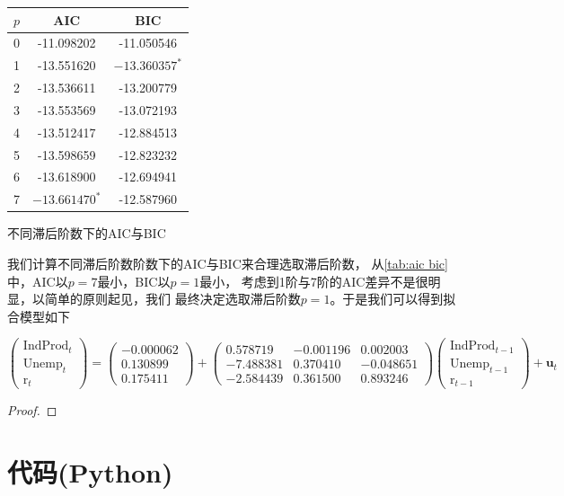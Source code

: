 \documentclass[cn]{homework}
\begin{document}
    \begin{margintable}
        \centering
        \begin{tabular}{ccc}
            \toprule
            $p$ & AIC  & BIC \\
            \midrule
            0 & -11.098202& -11.050546\\
            1 & -13.551620& $-13.360357^*$ \\
            2 & -13.536611& -13.200779\\
            3 & -13.553569& -13.072193\\
            4 & -13.512417& -12.884513\\
            5 & -13.598659& -12.823232\\
            6 & -13.618900& -12.694941\\
            7 & $-13.661470^*$ & -12.587960\\
            \bottomrule
        \end{tabular}
        \caption{不同滞后阶数下的AIC与BIC}
        \label{tab:aic bic}
    \end{margintable}
    我们计算不同滞后阶数阶数下的AIC与BIC来合理选取滞后阶数，
    从\cref{tab:aic bic}中，AIC以$p=7$最小，BIC以$p=1$最小，
    考虑到1阶与7阶的AIC差异不是很明显，以简单的原则起见，我们
    最终决定选取滞后阶数$p=1$。于是我们可以得到拟合模型如下
    \begin{fullwidth}
    \def\ind{\text{IndProd}}
    \def\une{\text{Unemp}}
    \def\rrr{\text{r}}
    \[\begin{pmatrix}
        \ind_t\\
        \une_t\\
        \rrr_t
    \end{pmatrix}
    =\begin{pmatrix}
        -0.000062\\
        0.130899\\
        0.175411
    \end{pmatrix}
    +\begin{pmatrix}
        0.578719 & -0.001196 & 0.002003\\
        -7.488381 & 0.370410 & -0.048651\\
        -2.584439 & 0.361500 & 0.893246
    \end{pmatrix}
    \begin{pmatrix}
        \ind_{t-1}\\
        \une_{t-1}\\
        \rrr_{t-1}
    \end{pmatrix}+\boldsymbol u_t\]
    \end{fullwidth}



    \problem
    \begin{subproblem}[(\alph*)]
        \item
        \begin{proof}

        \end{proof}
    \end{subproblem}

    \appendix
    \section{代码(Python)}
    
\end{document}
